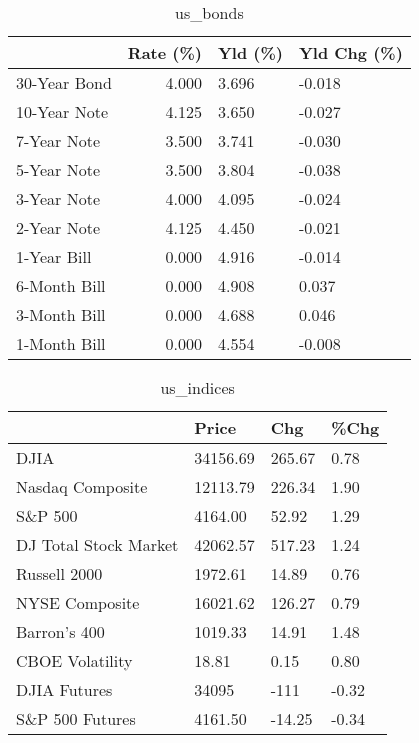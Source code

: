 \documentclass{article}%
\begin{document}
%


\begin{table}[htbp]%
\caption{us\_bonds}%
\centering%
\begin{adjustbox}{width=1\textwidth}%
\begin{tabular}{lrll}
\toprule
             &  Rate (\%) & Yld (\%) & Yld Chg (\%) \\
\midrule
30-Year Bond &     4.000 &   3.696 &      -0.018 \\
10-Year Note &     4.125 &   3.650 &      -0.027 \\
 7-Year Note &     3.500 &   3.741 &      -0.030 \\
 5-Year Note &     3.500 &   3.804 &      -0.038 \\
 3-Year Note &     4.000 &   4.095 &      -0.024 \\
 2-Year Note &     4.125 &   4.450 &      -0.021 \\
 1-Year Bill &     0.000 &   4.916 &      -0.014 \\
6-Month Bill &     0.000 &   4.908 &       0.037 \\
3-Month Bill &     0.000 &   4.688 &       0.046 \\
1-Month Bill &     0.000 &   4.554 &      -0.008 \\
\bottomrule
\end{tabular}
%
\end{adjustbox}%
\end{table}

%


\begin{table}[htbp]%
\caption{us\_indices}%
\centering%
\begin{adjustbox}{width=1\textwidth}%
\begin{tabular}{llll}
\toprule
                      &    Price &    Chg &  \%Chg \\
\midrule
                 DJIA & 34156.69 & 265.67 &  0.78 \\
     Nasdaq Composite & 12113.79 & 226.34 &  1.90 \\
              S\&P 500 &  4164.00 &  52.92 &  1.29 \\
DJ Total Stock Market & 42062.57 & 517.23 &  1.24 \\
         Russell 2000 &  1972.61 &  14.89 &  0.76 \\
       NYSE Composite & 16021.62 & 126.27 &  0.79 \\
         Barron's 400 &  1019.33 &  14.91 &  1.48 \\
      CBOE Volatility &    18.81 &   0.15 &  0.80 \\
         DJIA Futures &    34095 &   -111 & -0.32 \\
      S\&P 500 Futures &  4161.50 & -14.25 & -0.34 \\
\bottomrule
\end{tabular}
%
\end{adjustbox}%
\end{table}
\end{document}
